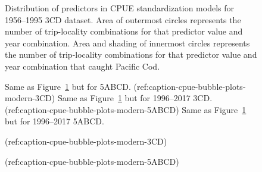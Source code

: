 \documentclass[11pt]{book}
\begin{document}
\begin{figure}[htb]

{\centering {} 

}

\caption{Distribution of predictors in CPUE standardization models for 1956--1995 3CD dataset. Area of outermost circles represents the number of trip-locality combinations for that predictor value and year combination. Area and shading of innermost circles represents the number of trip-locality combinations for that predictor value and year combination that caught Pacific Cod.}\label{fig:cpue-bubble-plots-hist-3CD}
\end{figure}

\begin{figure}[htb]

{\centering {} 

}

\caption{Same as Figure~\ref{fig:cpue-bubble-plots-hist-3CD} but for 5ABCD. (ref:caption-cpue-bubble-plots-modern-3CD) Same as Figure~\ref{fig:cpue-bubble-plots-hist-3CD} but for 1996--2017 3CD. (ref:caption-cpue-bubble-plots-modern-5ABCD) Same as Figure~\ref{fig:cpue-bubble-plots-hist-3CD} but for 1996--2017 5ABCD.}\label{fig:cpue-bubble-plots-hist-5ABCD}
\end{figure}
\begin{figure}[htb]

{\centering {} 

}

\caption{(ref:caption-cpue-bubble-plots-modern-3CD)}\label{fig:cpue-bubble-plots-modern-3CD}
\end{figure}
\begin{figure}[htb]

{\centering {} 

}

\caption{(ref:caption-cpue-bubble-plots-modern-5ABCD)}\label{fig:cpue-bubble-plots-modern-5ABCD}
\end{figure}
\end{document}
